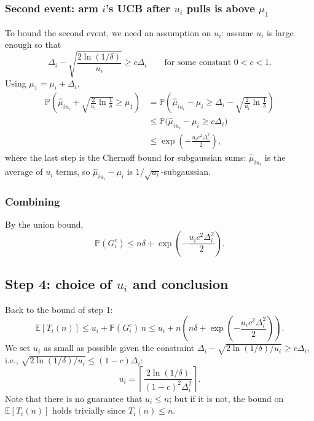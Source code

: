\subsubsection*{Second event: arm $i$'s UCB after $u_i$ pulls is above $\mu_1$}

To bound the second event, we need an assumption on $u_i$: assume $u_i$ is large enough so that
\[
\Delta_i - \sqrt{\frac{2\ln(1/\delta)}{u_i}} \geq c\Delta_i \qquad \text{for some constant } 0 < c < 1.
\]
Using $\mu_1 = \mu_i + \Delta_i$,
\begin{align*}
\mathbb{P}\left(\hat{\mu}_{iu_i} + \sqrt{\frac{2}{u_i}\ln\frac{1}{\delta}} \geq \mu_1\right) &= \mathbb{P}\left(\hat{\mu}_{iu_i} - \mu_i \geq \Delta_i - \sqrt{\frac{2}{u_i}\ln\frac{1}{\delta}}\right) \\
&\leq \mathbb{P}\big(\hat{\mu}_{iu_i} - \mu_i \geq c\Delta_i\big) \\
&\leq \exp\left(-\frac{u_i c^2 \Delta_i^2}{2}\right),
\end{align*}
where the last step is the Chernoff bound for subgaussian sums: $\hat{\mu}_{iu_i}$ is the average of $u_i$ terms, so $\hat{\mu}_{iu_i} - \mu_i$ is $1/\sqrt{u_i}$-subgaussian.

\subsubsection*{Combining}

By the union bound,
\[
\mathbb{P}(G_i^c) \leq n\delta + \exp\left(-\frac{u_i c^2\Delta_i^2}{2}\right).
\]

\subsection{Step 4: choice of $u_i$ and conclusion}

Back to the bound of step 1:
\[
\mathbb{E}[T_i(n)] \leq u_i + \mathbb{P}(G_i^c)\, n \leq u_i + n\left(n\delta + \exp\left(-\frac{u_i c^2\Delta_i^2}{2}\right)\right).
\]
We set $u_i$ as small as possible given the constraint $\Delta_i - \sqrt{2\ln(1/\delta)/u_i} \geq c\Delta_i$, i.e., $\sqrt{2\ln(1/\delta)/u_i} \leq (1-c)\Delta_i$:
\[
u_i = \left\lceil \frac{2\ln(1/\delta)}{(1-c)^2\Delta_i^2} \right\rceil.
\]
Note that there is no guarantee that $u_i \leq n$; but if it is not, the bound on $\mathbb{E}[T_i(n)]$ holds trivially since $T_i(n) \leq n$.

